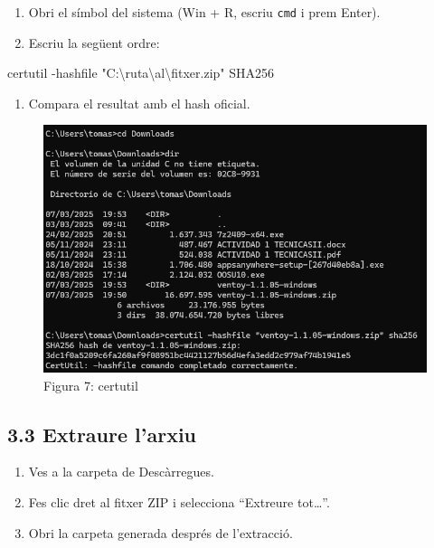 \documentclass[
  12 pt,
  a4paper,
]{article}
\newenvironment{Shaded}{\begin{snugshade}}{\end{snugshade}}
\newcommand{\AttributeTok}[1]{\textcolor[rgb]{0.13,0.29,0.53}{#1}}
\newcommand{\NormalTok}[1]{#1}
\newcommand{\StringTok}[1]{\textcolor[rgb]{0.31,0.60,0.02}{#1}}
\providecommand{\tightlist}{%
  \setlength{\itemsep}{0pt}\setlength{\parskip}{0pt}}
\begin{document}
\begin{enumerate}
\def\labelenumi{\arabic{enumi}.}
\tightlist
\item
  Obri el símbol del sistema (Win + R, escriu \texttt{cmd} i prem
  Enter).\\
\item
  Escriu la següent ordre:
\end{enumerate}

\begin{Shaded}
\begin{Highlighting}[]
\NormalTok{   certutil }\AttributeTok{{-}hashfile} \StringTok{"C:\textbackslash{}ruta\textbackslash{}al\textbackslash{}fitxer.zip"}\NormalTok{ SHA256}
\end{Highlighting}
\end{Shaded}

\begin{enumerate}
\def\labelenumi{\arabic{enumi}.}
\setcounter{enumi}{2}
\tightlist
\item
  Compara el resultat amb el hash oficial.
\end{enumerate}

\begin{figure}
\centering
\includegraphics{png/certutil.png}
\caption{Figura 7: certutil}
\end{figure}

\subsection{3.3 Extraure l'arxiu}\label{extraure-larxiu-1}

\begin{enumerate}
\def\labelenumi{\arabic{enumi}.}
\tightlist
\item
  Ves a la carpeta de Descàrregues.\\
\item
  Fes clic dret al fitxer ZIP i selecciona ``Extreure tot\ldots{}''.\\
\item
  Obri la carpeta generada després de l'extracció.
\end{enumerate}
\end{document}
